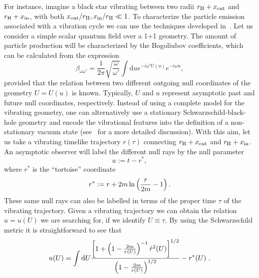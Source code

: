 \documentclass[11pt,a4paper]{article}
\newcommand{\diff}{\text{d}}
\begin{document}
For instance, imagine a black star vibrating between two radii $r_\text{H}+x_{\rm
out}$ and $r_\text{H}+x_{\rm in}$, with both $x_{\rm out}/r_\text{H},x_{\rm in}/r_\text{H} \ll 1$. 
To characterize the particle emission associated with a vibration cycle we can 
use the techniques developed in~\cite{barcelo-min,barcelo-gen,barbado}.
Let us consider a simple scalar quantum field over a 1+1 geometry. The amount of 
particle production will be characterized by the Bogoliubov coefficients, which can be calculated from the expression~\cite{barcelo-rad-no-hor} 
%
\begin{equation}
\beta_{\omega \omega'} = \frac{1}{2 \pi} \sqrt{\frac{\omega}{\omega'}} \int \diff u e^{-i \omega' U(u)} e^{-i \omega u},
\label{scalar.prod.integral}
\end{equation}
%
 provided that the relation between two different outgoing null
coordinates of the geometry $U=U(u)$ is known. Typically, $U$ and $u$ represent
asymptotic past and future null coordinates, respectively. Instead of using a
complete model for the vibrating geometry, one can alternatively use  a
stationary Schwarzschild-black-hole geometry and encode the
vibrational features into the definition of a  non-stationary vacuum
state (see~\cite{barbado} for a more detailed discussion). With this aim, let us take
a vibrating timelike trajectory $r(\tau)$ connecting $r_\text{H}+x_{\rm out}$ and
$r_\text{H}+x_{\rm in}$. An asymptotic observer will label the different null rays  by
the null parameter 
%
\begin{equation}
u:= t-r^*, 
\label{rays}
\end{equation}
%
where $r^*$ is the ``tortoise'' coordinate
%
\begin{equation}
r^* := r + 2m \ln \left({r \over 2m} - 1 \right).
\label{tortoise}
\end{equation}
%
These same null rays can also  be labelled in terms of  the proper time $\tau$ of the vibrating trajectory. Given a vibrating 
trajectory we can obtain the relation $u=u(U)$ we are
searching for, if we identify $U \equiv \tau$. By using the Schwarzschild metric it is straightforward to see that 
%
\begin{align}
u(U) =  \int \diff U{ \left[1+ \left(1-{2m \over r(U)}\right)^{-1} \dot r^2(U)\right]^{1/2} \over  \left(1-{2m \over r(U)}\right)^{1/2} } -r^*(U)~.
\label{relation-complete}
\end{align}
%
 
\end{document}
